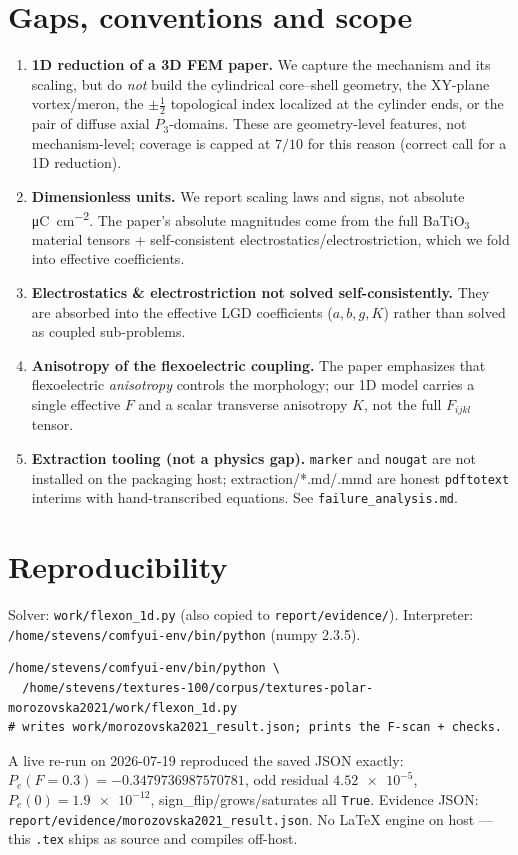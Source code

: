 \documentclass[11pt]{article}
\begin{document}
\section{Gaps, conventions and scope}\label{sec:gaps}
\begin{enumerate}
  \item \textbf{1D reduction of a 3D FEM paper.} We capture the mechanism and its
    scaling, but do \emph{not} build the cylindrical core--shell geometry, the
    XY-plane vortex/meron, the $\pm\tfrac12$ topological index localized at the
    cylinder ends, or the pair of diffuse axial $P_3$-domains. These are
    geometry-level features, not mechanism-level; coverage is capped at $7/10$
    for this reason (correct call for a 1D reduction).
  \item \textbf{Dimensionless units.} We report scaling laws and signs, not
    absolute \si{\micro\coulomb\per\centi\meter\squared}. The paper's absolute
    magnitudes come from the full BaTiO$_3$ material tensors + self-consistent
    electrostatics/electrostriction, which we fold into effective coefficients.
  \item \textbf{Electrostatics \& electrostriction not solved self-consistently.}
    They are absorbed into the effective LGD coefficients ($a,b,g,K$) rather than
    solved as coupled sub-problems.
  \item \textbf{Anisotropy of the flexoelectric coupling.} The paper emphasizes
    that flexoelectric \emph{anisotropy} controls the morphology; our 1D model
    carries a single effective $F$ and a scalar transverse anisotropy $K$, not
    the full $F_{ijkl}$ tensor.
  \item \textbf{Extraction tooling (not a physics gap).} \texttt{marker} and
    \texttt{nougat} are not installed on the packaging host; extraction/*.md/.mmd
    are honest \texttt{pdftotext} interims with hand-transcribed equations. See
    \texttt{failure\_analysis.md}.
\end{enumerate}

\section{Reproducibility}
Solver: \texttt{work/flexon\_1d.py} (also copied to
\texttt{report/evidence/}). Interpreter:
\texttt{/home/stevens/comfyui-env/bin/python} (numpy 2.3.5).
\begin{verbatim}
/home/stevens/comfyui-env/bin/python \
  /home/stevens/textures-100/corpus/textures-polar-morozovska2021/work/flexon_1d.py
# writes work/morozovska2021_result.json; prints the F-scan + checks.
\end{verbatim}
A live re-run on 2026-07-19 reproduced the saved JSON exactly:
$P_e(F{=}0.3)=-0.3479736987570781$, odd residual $\num{4.52e-5}$,
$P_e(0)=\num{1.9e-12}$, sign\_flip/grows/saturates all \texttt{True}.
Evidence JSON: \texttt{report/evidence/morozovska2021\_result.json}.
No LaTeX engine on host --- this \texttt{.tex} ships as source and compiles
off-host.
\end{document}
